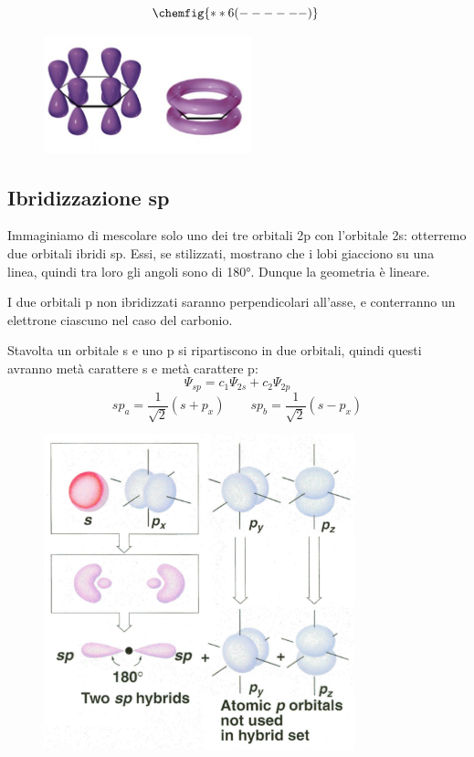 \hspace{1cm}\begin{minipage}{0.4\textwidth}
    $$
    \chemfig{**6(------)}\
    $$
\end{minipage} \hfill
\begin{minipage}{0.6\textwidth}
    \begin{figure}[H]
        \includegraphics[width=6cm]{immagini/benzene.png}
    \end{figure}
\end{minipage}

\subsection{Ibridizzazione sp}
Immaginiamo di mescolare solo uno dei tre orbitali 2p con l'orbitale 2s: otterremo due orbitali ibridi sp. Essi, se stilizzati, mostrano che i lobi giacciono su una linea, quindi tra loro gli angoli sono di 180°. Dunque la geometria è lineare.

I due orbitali p non ibridizzati saranno perpendicolari all'asse, e conterranno un elettrone ciascuno nel caso del carbonio.

Stavolta un orbitale s e uno p si ripartiscono in due orbitali, quindi questi avranno metà carattere s e metà carattere p:
$$\Psi_{sp}= c_1\Psi_{2s} + c_2\Psi_{2p}$$
$$
sp_a=\frac{1}{\sqrt{2}}(s + p_x)
\qquad
sp_b=\frac{1}{\sqrt{2}}(s - p_x)
$$
\begin{figure}[H]
    \centering
    \includegraphics[width=9cm]{immagini/orbitali-sp.png}
\end{figure}

